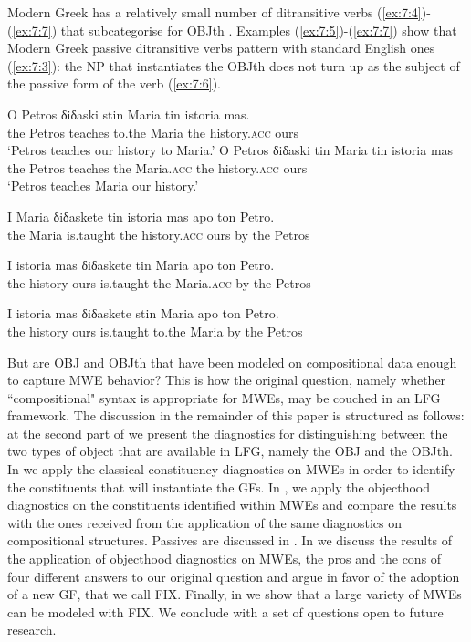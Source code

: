 \documentclass[output=paper]{langsci/langscibook}
\begin{document}
Modern Greek has a relatively small number of ditransitive verbs (\ref{ex:7:4})-(\ref{ex:7:7}) that subcategorise for OBJth  \citep{kordoni2004}. Examples (\ref{ex:7:5})-(\ref{ex:7:7}) show that Modern Greek passive ditransitive verbs pattern with standard English ones (\ref{ex:7:3}):  the NP that instantiates the OBJth does not turn up as the subject of the passive form of the verb (\ref{ex:7:6}). 

\begin{exe}
\ex \label{ex:7:4}
\begin{xlist}
\ex
\gll O Petros δiδaski stin Maria tin istoria mas. \\
          the Petros teaches to.the  Maria the history.\textsc{acc} ours\\
\glt     `Petros teaches our history to Maria.’
\ex
\gll O Petros δiδaski tin Maria tin istoria mas \\
         the Petros teaches the  Maria.\textsc{acc} the  history.\textsc{acc} ours\\
\glt    `Petros teaches Maria our history.'
\end{xlist}
\end{exe}

\ea
\label{ex:7:5}
\gll  I Maria δiδaskete tin istoria mas apo ton Petro.\\
the Maria is.taught the history.\textsc{acc} ours by the Petros\\
\z

\ea
\label{ex:7:6}
\gll *I istoria mas δiδaskete tin Maria apo ton Petro.\\
            the history ours is.taught the  Maria.\textsc{acc} by the Petros\\
\z

\ea
\label{ex:7:7}
\gll  I istoria mas δiδaskete stin Maria apo ton Petro.\\
          the history ours is.taught to.the Maria by the Petros\\
\z


But are OBJ and OBJth that have been modeled on compositional data enough to capture MWE behavior? This is how the original question, namely whether ``compositional" syntax is appropriate for MWEs, may be couched in an LFG framework. The discussion in the remainder of this paper is structured as follows: at the second part of  we present the diagnostics for distinguishing between the two types of object that are available in LFG, namely the OBJ and the OBJth. In  we apply the classical constituency diagnostics on MWEs in order to identify the constituents that will instantiate the GFs. In , we apply the objecthood diagnostics on the constituents identified within MWEs and compare the results with the ones received from the application of the same diagnostics on compositional structures. Passives are discussed in . In  we discuss the results of the application of objecthood diagnostics on MWEs, the pros and the cons of four different answers to our original question and argue in favor of the adoption of a new GF, that we call FIX. Finally, in  we show that a large variety of MWEs can be modeled with FIX. We conclude with a set of questions open to future research.
\end{document}

